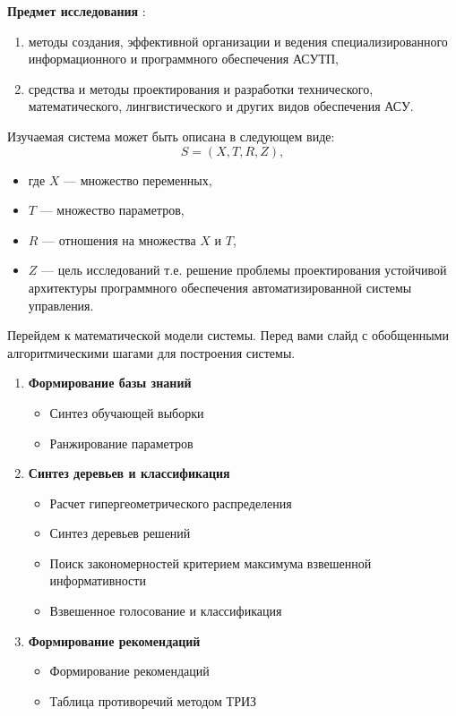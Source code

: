 \documentclass[review]{elsarticle}
\begin{document}
\textbf{Предмет исследования} :
\begin{enumerate}
\item методы  создания, эффективной организации и ведения специализированного информационного и программного обеспечения АСУТП,
\item средства и методы проектирования и разработки технического, математического, лингвистического и других видов обеспечения АСУ.
\end{enumerate}


Изучаемая система может быть описана в следующем виде:
\begin{equation}
    \label{eq:equation29}
    S =  (X, T, R, Z ) ,
\end{equation}
\begin{itemize}
    \item где $ X $  — множество переменных, 
    \item $T$ — множество параметров, 
    \item $R$ — отношения на множества $X$ и $T$, 
    \item $Z$ — цель исследований т.е. решение проблемы проектирования устойчивой архитектуры программного обеспечения автоматизированной системы управления.
\end{itemize}

Перейдем к математической модели системы.
Перед вами слайд с обобщенными алгоритмическими шагами для
построения системы.


    \begin{enumerate}
        \item \textbf{Формирование базы знаний}
              \begin{itemize}
                  \item Синтез обучающей выборки
                  \item Ранжирование параметров
              \end{itemize}
        \item \textbf{Синтез деревьев и классификация}
              \begin{itemize}
                  \item Расчет гипергеометрического распределения
                  \item Синтез деревьев решений
                  \item Поиск закономерностей критерием максимума взвешенной информативности
                  \item Взвешенное голосование и классификация
              \end{itemize}
        \item \textbf{Формирование рекомендаций}
              \begin{itemize}
                  \item Формирование рекомендаций
                  \item Таблица противоречий методом ТРИЗ
              \end{itemize}
    \end{enumerate}
\end{document}
